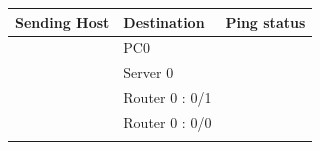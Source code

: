 \documentclass[a4paper,11pt]{article}
\begin{document}
\begin{enumerate}




          \begin{table}[H]
              \centering

              \begin{tabular} {| m{9em}| m{12em}| m{9em} |}
                  \hline
                  {\cellcolor[rgb]{0.333,0.686,1}}\textbf{Sending Host}           & \textbf{Destination} & \textbf{Ping status}                                                     \\
                  \hline
                  {\cellcolor[rgb]{0.333,0.686,1}}                                & PC0                  & {\cellcolor[rgb]{1,0.173,0.09}}                                          \\
                  \hhline{|>{\arrayrulecolor[rgb]{0.333,0.686,1}}->{\arrayrulecolor{black}}->{\arrayrulecolor[rgb]{1,0.173,0.09}}->{\arrayrulecolor{black}}|}
                  {\cellcolor[rgb]{0.333,0.686,1}}                                & Server 0             & {\cellcolor[rgb]{1,0.173,0.09}}                                          \\
                  \hhline{|>{\arrayrulecolor[rgb]{0.333,0.686,1}}->{\arrayrulecolor{black}}->{\arrayrulecolor[rgb]{1,0.173,0.09}}->{\arrayrulecolor{black}}|}
                  {\cellcolor[rgb]{0.333,0.686,1}}                                & Router 0 : 0/1       & {\cellcolor[rgb]{1,0.173,0.09}}                                          \\
                  \hhline{|>{\arrayrulecolor[rgb]{0.333,0.686,1}}->{\arrayrulecolor{black}}->{\arrayrulecolor[rgb]{1,0.173,0.09}}->{\arrayrulecolor{black}}|}
                  {\cellcolor[rgb]{0.333,0.686,1}}                                & Router 0 : 0/0       & {\cellcolor[rgb]{1,0.173,0.09}}                                          \\
                  \hhline{|>{\arrayrulecolor[rgb]{0.333,0.686,1}}->{\arrayrulecolor{black}}->{\arrayrulecolor[rgb]{1,0.173,0.09}}->{\arrayrulecolor{black}}|}

\end{tabular}
\end{table}
\end{enumerate}
\end{document}
